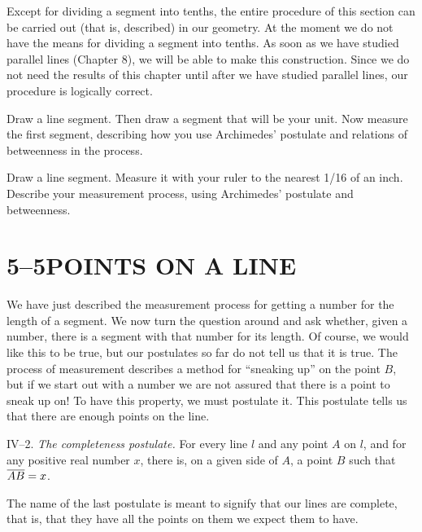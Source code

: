 \documentclass[11pt]{book}
\begin{document}
Except for dividing a segment into tenths, the entire procedure of this section
can be carried out (that is, described) in our geometry. At the moment we do
not have the means for dividing a segment into tenths. As soon as we have
studied parallel lines (Chapter 8), we will be able to make this construction.
Since we do not need the results of this chapter until after we have studied
parallel lines, our procedure is logically correct.


\begin{exercisecols}
\begin{exlist}
\item Draw a line segment. Then draw a segment that will be your unit. Now
      measure the first segment, describing how you use Archimedes' postulate
      and relations of betweenness in the process.
\item Draw a line segment. Measure it with your ruler to the nearest 1/16 of an
      inch. Describe your measurement process, using Archimedes' postulate and
      betweenness.
\end{exlist}
\end{exercisecols}

\section*{5--5\quad POINTS ON A LINE}

We have just described the measurement process for getting a number for the
length of a segment. We now turn the question around and ask whether, given a
number, there is a segment with that number for its length. Of course, we would
like this to be true, but our postulates so far do not tell us that it is true.
The process of measurement describes a method for ``sneaking up'' on the point
$B$, but if we start out with a number we are not assured that there is a point
to sneak up on! To have this property, we must postulate it. This postulate
tells us that there are enough points on the line.

\medskip
IV--2. \emph{The completeness postulate.} For every line $l$ and any point $A$
on $l$, and for any positive real number $x$, there is, on a given side of $A$,
a point $B$ such that $\overline{AB} = x$.

\medskip
The name of the last postulate is meant to signify that our lines are complete,
that is, that they have all the points on them we expect them to have.
\end{document}
